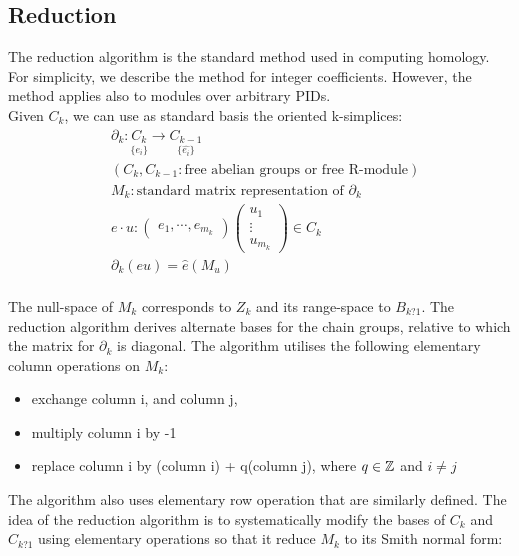 \documentclass[11pt,a4paper]{report}
\begin{document}
              \subsection{Reduction}

              The reduction algorithm is the standard method used in computing homology. For simplicity,
              we describe the method for integer coefficients. However, the method applies also to modules over arbitrary PIDs. \\

              Given $C_k$, we can use as standard basis the oriented k-simplices:
              \begin{align*}
                &\partial_k: \underset{\{e_i\}}{C_k} \rightarrow \underset{\{\hat{e_i}\}}{C_{k-1}}\\
                &(C_{k}, C_{k-1}: \textrm{free abelian groups or free R-module})\\
                & M_k: \textrm{standard matrix representation of } \partial_k\\
                &e \cdot u: {\begin{pmatrix}e_1, \cdots, e_{m_k}\end{pmatrix}}{\begin{pmatrix}u_1\\\vdots\\u_{m_k}\end{pmatrix}} \in C_k\\
                &\partial_k(eu) = \hat{e}(M_u)\\
              \end{align*}

               The null-space of $M_k$ corresponds to $Z_k$ and its range-space to
                $B_{k?1}$. The reduction algorithm derives alternate bases for the
                chain groups, relative to which the matrix for $\partial_k$ is diagonal. The algorithm utilises the following elementary column operations on $M_k$:

                \begin{itemize}
                 \item exchange column i, and column j,
                 \item multiply column i by -1
                 \item replace column i by (column i) + q(column j), where $q \in \mathbb{Z}$ and $i \ne j$
                \end{itemize}

                The algorithm also uses elementary row operation that are similarly defined. The idea of the reduction algorithm is to systematically modify the bases of $C_k$ and $C_{k?1}$ using elementary operations so that it reduce $M_k$ to its Smith normal form:
\end{document}
